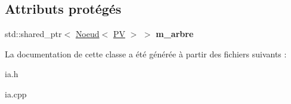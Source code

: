 \subsection*{Attributs protégés}
\begin{DoxyCompactItemize}
\item 
std\+::shared\+\_\+ptr$<$ \hyperlink{classNoeud}{Noeud}$<$ \hyperlink{structIA_1_1PV}{PV} $>$ $>$ {\bfseries m\+\_\+arbre}\hypertarget{classIA_a6666e00b08d090ab464d1847c6b9db32}{}\label{classIA_a6666e00b08d090ab464d1847c6b9db32}

\end{DoxyCompactItemize}


La documentation de cette classe a été générée à partir des fichiers suivants \+:\begin{DoxyCompactItemize}
\item 
ia.\+h\item 
ia.\+cpp\end{DoxyCompactItemize}
